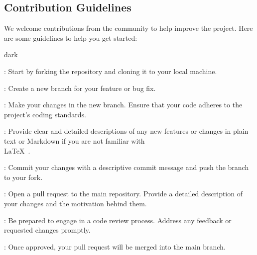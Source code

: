\subsection{Contribution Guidelines}
\label{sec:start:sub:guidelines}
We welcome contributions from the community to help improve the project. Here are some guidelines to help you get started:
\bigskip

\begin{baseBoxOne}{}{dark}
    \begin{posnexItemize}
        \item[\sA] : Start by forking the repository and cloning it to your local machine.
        \item[\sA] : Create a new branch for your feature or bug fix.
        \item[\sA] : Make your changes in the new branch. Ensure that your code adheres to the project's coding standards.
        \item[\sA] : Provide clear and detailed descriptions of any new features or changes in plain text or Markdown if you are not familiar with \\LaTeX~.
        \item[\sA] : Commit your changes with a descriptive commit message and push the branch to your fork.
        \item[\sA] : Open a pull request to the main repository. Provide a detailed description of your changes and the motivation behind them.
        \item[\sA] : Be prepared to engage in a code review process. Address any feedback or requested changes promptly.
        \item[\sA] : Once approved, your pull request will be merged into the main branch.
    \end{posnexItemize}
\end{baseBoxOne}


